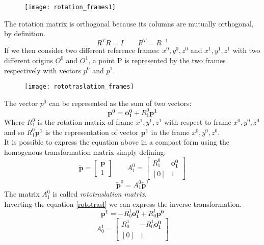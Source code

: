 \begin{figure}[h!]
	\centering
	\texttt{[image: rotation\_frames1]}
	\caption{}
\end{figure}
The rotation matrix is orthogonal because its columns are mutually orthogonal, by definition.
\begin{equation}
	R^TR=I \qquad R^T=R^{-1}
\end{equation}
If we then consider two different reference frames: $x^0,y^0,z^0$ and $x^1,y^1,z^1$ with two different origins $O^0$ and $O^1$, a point P is represented by the two frames respectively with vectors $p^0$ and $p^1$.
\begin{figure}[h!]
	\centering
	\texttt{[image: rototraslation\_frames]}
	\caption{}
\end{figure}
The vector $p^0$ can be represented as the sum of two vectors:
\begin{equation} \label{rototrasl}
	\mathbf{p^0}= \mathbf{o_1^0} + R_1^0 \mathbf{p^1}
\end{equation}
Where $R^0_1$ is the rotation matrix of frame $x^1,y^1,z^1$ with respect to frame $x^0,y^0,z^0$ and so $R_1^0 \mathbf{p^1}$ is the representation of vector $\mathbf{p^1}$ in the frame $x^0,y^0,z^0$.\\
It is possible to express the equation above in a compact form using the homogenous transformation matrix simply defining:
\begin{equation} \label{A}
	\tilde{\mathbf{p}}=\left[
	\begin{matrix}
	\textbf{p} \\ 1
	\end{matrix}
	\right] \qquad 
	A_1^0 = \left[
	\begin{matrix}
       R_1^0 & \mathbf{o_1^0} \\ [0] & 1
	\end{matrix}
	\right]
\end{equation}
\begin{equation}
	\tilde{\mathbf{p}}^0 = A_1^0\tilde{\mathbf{p}}^1
\end{equation}
The matrix $A_1^0$ is called \textit{rototraslation matrix}.\\
Inverting the equation \ref{rototrasl} we can express the inverse transformation.
\begin{equation} 
\mathbf{p^1}= -R_0^1\mathbf{o_1^0} + R_0^1 \mathbf{p^0}
\end{equation}
\begin{equation}
	A_0^1 = \left[
	\begin{matrix}
		R_0^1 & -R_0^1\mathbf{o_1^0} \\ [0] & 1
	\end{matrix}
	\right]
\end{equation}
